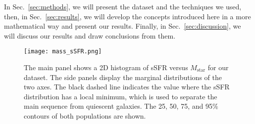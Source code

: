 \documentclass[fleqn,usenatbib]{mnras}
\begin{document}
In Sec.~\ref{sec:methods}, we will present the dataset and the techniques we used, then, in Sec.~\ref{sec:results}, we will develop the concepts introduced here in a more mathematical way and present our results. Finally, in Sec.~\ref{sec:discussion}, we will discuss our results and draw conclusions from them.


\begin{figure}
    \begin{centering}
	\texttt{[image: mass\_sSFR.png]}
    \caption{The main panel shows a 2D histogram of sSFR versus $M_{\text{star}}$ for our dataset. The side panels display the marginal distributions of the two axes. The black dashed line indicates the value where the sSFR distribution has a local minimum, which is used to separate the main sequence from quiescent galaxies. The 25, 50, 75, and 95\% contours of both populations are shown.}
    \end{centering}
    \label{fig:mass_sSFR}
\end{figure}
\newpage
\end{document}
